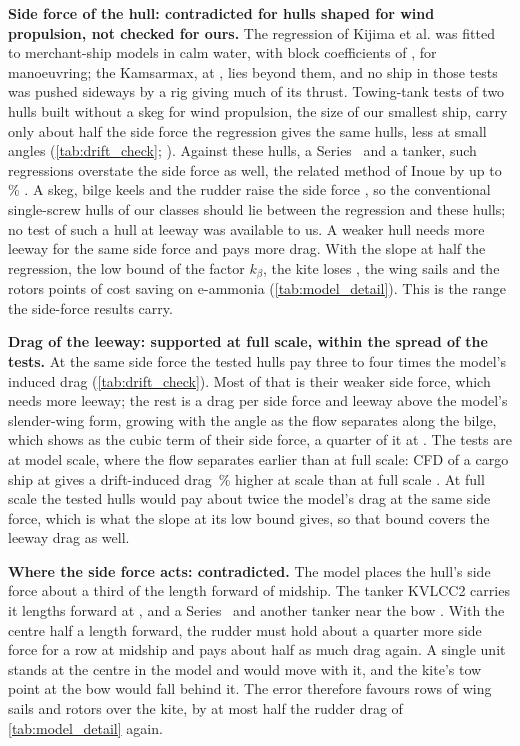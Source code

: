\textbf{Side force of the hull: contradicted for hulls shaped for wind propulsion, not checked for ours.} The regression of Kijima et al. was fitted to  merchant-ship models in calm water, with block coefficients of , for manoeuvring; the Kamsarmax, at , lies beyond them, and no ship in those tests was pushed sideways by a rig giving much of its thrust. Towing-tank tests of two  hulls built without a skeg for wind propulsion, the size of our smallest ship, carry only about half the side force the regression gives the same hulls, less at small angles (\cref{tab:drift_check}; \citealp{vanderkolk2021}). Against these hulls, a Series~ and a tanker, such regressions overstate the side force as well, the related method of Inoue by up to \,\% \citep{tillig2020}. A skeg, bilge keels and the rudder raise the side force \citep{vanderkolk2021}, so the conventional single-screw hulls of our classes should lie between the regression and these hulls; no test of such a hull at leeway was available to us. A weaker hull needs more leeway for the same side force and pays more drag. With the slope at half the regression, the low bound of the factor $k_\beta$, the kite loses \NumWeakHullKite, the wing sails \NumWeakHullWings{} and the rotors \NumWeakHullRotors{} points of cost saving on e-ammonia (\cref{tab:model_detail}). This is the range the side-force results carry.

\textbf{Drag of the leeway: supported at full scale, within the spread of the tests.} At the same side force the tested hulls pay three to four times the model's induced drag (\cref{tab:drift_check}). Most of that is their weaker side force, which needs more leeway; the rest is a drag per side force and leeway above the model's slender-wing form, growing with the angle as the flow separates along the bilge, which shows as the cubic term of their side force, a quarter of it at . The tests are at model scale, where the flow separates earlier than at full scale: CFD of a cargo ship at  gives a drift-induced drag \,\% higher at scale  than at full scale \citep{kramer2022b}. At full scale the tested hulls would pay about twice the model's drag at the same side force, which is what the slope at its low bound gives, so that bound covers the leeway drag as well.

\textbf{Where the side force acts: contradicted.} The model places the hull's side force about a third of the length forward of midship. The tanker KVLCC2 carries it  lengths forward at  \citep{kramer2022}, and a Series~ and another tanker near the bow \citep{tillig2020}. With the centre half a length forward, the rudder must hold about a quarter more side force for a row at midship and pays about half as much drag again. A single unit stands at the centre in the model and would move with it, and the kite's tow point at the bow would fall behind it. The error therefore favours rows of wing sails and rotors over the kite, by at most half the rudder drag of \cref{tab:model_detail} again.

